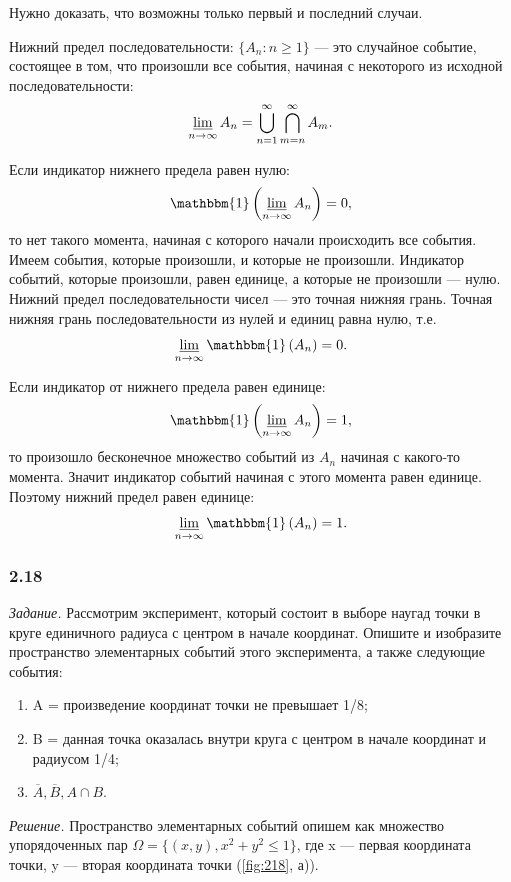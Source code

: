 \begin{enumerate}[label=\alph*)]
Нужно доказать, что возможны только первый и последний случаи.

Нижний предел последовательности:
$\{ A_n : n \geq 1 \}$ --- это случайное событие, состоящее в том, что произошли все события, начиная с некоторого из исходной последовательности:
$$\varliminf \limits_{n\to\infty} A_n = \bigcup \limits_{n=1}^\infty \bigcap \limits_{m=n}^\infty A_m. $$

Если индикатор нижнего предела равен нулю:
$$ \mathbbm{1} \left( \varliminf \limits_{n\to\infty} A_n \right) = 0 , $$
то нет такого момента, начиная с которого начали происходить все события.
Имеем события, которые произошли, и которые не произошли.
Индикатор событий, которые произошли, равен единице, а которые не произошли --- нулю.
Нижний предел последовательности чисел --- это точная нижняя грань.
Точная нижняя грань последовательности из нулей и единиц равна нулю, т.е.
$$\varliminf \limits_{n\to\infty} \mathbbm{1} \left( A_n \right) = 0 . $$

Если индикатор от нижнего предела равен единице:
$$ \mathbbm{1} \left( \varliminf \limits_{n\to\infty} A_n \right) = 1 , $$
то произошло бесконечное множество событий из $A_n$ начиная с какого-то момента.
Значит индикатор событий начиная с этого момента равен единице.
Поэтому нижний предел равен единице:
$$\varliminf \limits_{n\to\infty} \mathbbm{1} \left( A_n \right) = 1 . $$
\end{enumerate}

\subsubsection*{2.18}

\textit{Задание.} Рассмотрим эксперимент, который состоит в выборе наугад точки в круге единичного радиуса с центром в начале координат.
Опишите и изобразите пространство элементарных событий этого эксперимента, а также следующие события:
\begin{enumerate}[label=\alph*)]
\item A = {произведение координат точки не превышает 1/8};
\item B = {данная точка оказалась внутри круга с центром в начале координат и радиусом 1/4};
\item $ \overline{ A },
\overline{ B },
A \cap B $.
\end{enumerate}

\textit{Решение.}
Пространство элементарных событий опишем как множество упорядоченных пар
$ \Omega =
\{ (x, y), x^2 + y^2 \leq 1 \} $,
где x --- первая координата точки, y --- вторая координата точки (\ref{fig:218}, а)).

